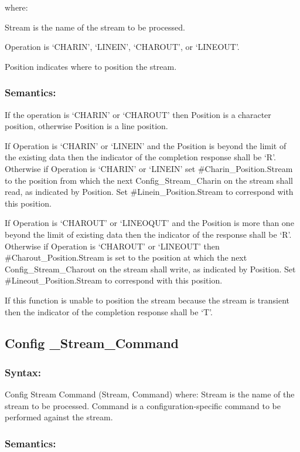 where:

Stream is the name of the stream to be processed.

Operation is `CHARIN', `LINEIN', `CHAROUT', or `LINEOUT'.

Position indicates where to position the stream.

\subsubsection{Semantics:}\label{semantics-25}

If the operation is `CHARIN' or `CHAROUT' then Position is a character
position, otherwise Position is a line position.

If Operation is `CHARIN' or `LINEIN' and the Position is beyond the
limit of the existing data then the indicator of the completion response
shall be `R'. Otherwise if Operation is `CHARIN' or `LINEIN' set
\#Charin\_Position.Stream to the position from which the next
Config\_Stream\_Charin on the stream shall read, as indicated by
Position. Set \#Linein\_Position.Stream to correspond with this
position.

If Operation is `CHAROUT' or `LINEOQUT' and the Position is more than
one beyond the limit of existing data then the indicator of the response
shall be `R'. Otherwise if Operation is `CHAROUT' or `LINEOUT' then
\#Charout\_Position.Stream is set to the position at which the next
Config\_Stream\_Charout on the stream shall write, as indicated by
Position. Set \#Lineout\_Position.Stream to correspond with this
position.

If this function is unable to position the stream because the stream is
transient then the indicator of the completion response shall be `T'.

\subsection{Config \_Stream\_Command}\label{config-_stream_command}

\subsubsection{Syntax:}\label{syntax-25}

Config Stream Command (Stream, Command) where: Stream is the name of the
stream to be processed. Command is a configuration-specific command to
be performed against the stream.

\subsubsection{Semantics:}\label{semantics-26}

